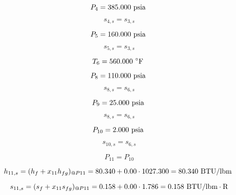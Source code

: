 \documentclass{article}
\begin{document}
\begin{equation}
P_{ 4} =  385.000\textnormal{ psia                      }
\end{equation}

\begin{equation}
s_{ 4,s} = s_{ 3,s}
\end{equation}

\begin{equation}
P_{ 5} =  160.000\textnormal{ psia                      }
\end{equation}

\begin{equation}
s_{ 5,s} = s_{ 3,s}
\end{equation}

\begin{equation}
T_{ 6} =  560.000\textnormal{ \(^{\circ}\)F             }
\end{equation}

\begin{equation}
P_{ 8} =  110.000\textnormal{ psia                      }
\end{equation}

\begin{equation}
s_{ 8,s} = s_{ 6,s}
\end{equation}

\begin{equation}
P_{ 9} =   25.000\textnormal{ psia                      }
\end{equation}

\begin{equation}
s_{ 8,s} = s_{ 6,s}
\end{equation}

\begin{equation}
P_{10} =    2.000\textnormal{ psia                      }
\end{equation}

\begin{equation}
s_{10,s} = s_{ 6,s}
\end{equation}

\begin{equation}
P_{11} = P_{10}
\end{equation}

\begin{equation}
  h_{11,s} = (h_{f} + x_{11}h_{fg})_{@P11} =   80.340 + 0.00\cdot1027.300 =   80.340
\textnormal{ BTU/lbm                   }
\end{equation}

\begin{equation}
  s_{11,s} = (s_{f} + x_{11}s_{fg})_{@P11} =    0.158 + 0.00\cdot   1.786 =    0.158
\textnormal{ BTU/lbm}\cdot\textnormal{R}
\end{equation}
\end{document}
